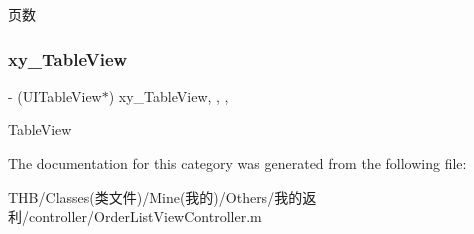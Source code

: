 页数 \mbox{\label{category_order_list_view_controller_07_08_a21083b7bd562dd270bc147a81a01cd7f}} 
\subsubsection{\texorpdfstring{xy\+\_\+\+Table\+View}{xy\_TableView}}
{\footnotesize\ttfamily -\/ (U\+I\+Table\+View$\ast$) xy\+\_\+\+Table\+View\hspace{0.3cm}{\ttfamily [read]}, {\ttfamily [write]}, {\ttfamily [nonatomic]}, {\ttfamily [strong]}}

Table\+View 

The documentation for this category was generated from the following file\+:\begin{DoxyCompactItemize}
\item 
T\+H\+B/\+Classes(类文件)/\+Mine(我的)/\+Others/我的返利/controller/Order\+List\+View\+Controller.\+m\end{DoxyCompactItemize}
